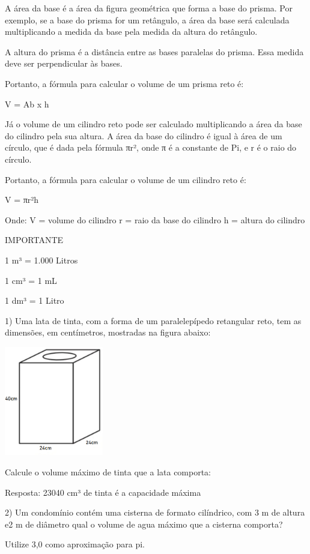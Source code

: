 A área da base é a área da figura geométrica que forma a base do prisma.
Por exemplo, se a base do prisma for um retângulo, a área da base será
calculada multiplicando a medida da base pela medida da altura do
retângulo.

A altura do prisma é a distância entre as bases paralelas do prisma.
Essa medida deve ser perpendicular às bases.

Portanto, a fórmula para calcular o volume de um prisma reto é:

V = Ab x h

Já o volume de um cilindro reto pode ser calculado multiplicando a área
da base do cilindro pela sua altura. A área da base do cilindro é igual
à área de um círculo, que é dada pela fórmula πr², onde π é a constante
de Pi, e r é o raio do círculo.

Portanto, a fórmula para calcular o volume de um cilindro reto é:

V = πr²h

Onde: V = volume do cilindro r = raio da base do cilindro h = altura do
cilindro

IMPORTANTE

1 m³ = 1.000 Litros

1 cm³ = 1 mL

1 dm³ = 1 Litro


1) Uma lata de tinta, com a forma de um paralelepípedo retangular reto,
tem as dimensões, em centímetros, mostradas na figura abaixo:

\includegraphics[width=1.69792in,height=1.88115in]{./imgSAEB_6_MAT/media/image95.png}

Calcule o volume máximo de tinta que a lata comporta:

Resposta: 23040 cm³ de tinta é a capacidade máxima

2) Um condomínio contém uma cisterna de formato cilíndrico, com 3 m de
altura e2 m de diâmetro qual o volume de agua máximo que a cisterna
comporta?

Utilize 3,0 como aproximação para pi.

